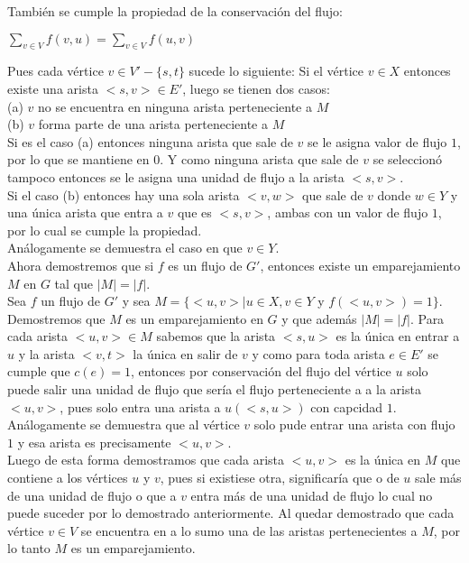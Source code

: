 \documentclass[12pt,a4paper]{report}
\begin{document}
Tambi\'en se cumple la propiedad de la conservaci\'on del flujo:
\begin{center}
$\sum_{v \in V}f(v,u) = \sum_{v \in V}f(u,v)$
\end{center}
Pues cada v\'ertice $v \in V'-\{s,t\}$ sucede lo siguiente: Si el v\'ertice $v \in X$ entonces existe una arista $<s,v> \in E'$, luego se tienen dos casos:\\
\newline
(a) $v$ no se encuentra en ninguna arista perteneciente a $M$\\
(b) $v$ forma parte de una arista perteneciente a $M$\\\newline
Si es el caso (a) entonces ninguna arista que sale de $v$ se le asigna valor de flujo $1$, por lo que se mantiene en $0$. Y como ninguna arista que sale de $v$ se seleccion\'o tampoco entonces se le asigna una unidad de flujo a la arista $<s,v>$.\\
Si el caso (b) entonces hay una sola arista $<v,w>$ que sale de $v$ donde $w \in Y$ y una \'unica arista que entra a $v$ que es $<s,v>$, ambas con un valor de flujo $1$, por lo cual se cumple la propiedad.
\\\newline
An\'alogamente se demuestra el caso en que $v \in Y$.
\\\newline
Ahora demostremos que si $f$ es un flujo de $G'$, entonces existe un emparejamiento $M$ en $G$ tal que $|M|=|f|$.
\\\newline
Sea $f$ un flujo de $G'$ y sea $M=\{<u,v>|u \in X,v \in Y$ y $f(<u,v>)=1\}$. Demostremos que $M$ es un emparejamiento en $G$ y que adem\'as $|M|=|f|$. Para cada arista $<u,v> \in M$ sabemos que la arista $<s,u>$ es la \'unica en entrar a $u$ y la arista $<v,t>$ la \'unica en salir de $v$ y como para toda arista $e \in E'$ se cumple que $c(e)=1$, entonces por conservaci\'on del flujo del v\'ertice $u$ solo puede salir una unidad de flujo que ser\'ia el flujo perteneciente a a la arista $<u,v>$, pues solo entra una arista a $u (<s,u>)$ con capcidad $1$.\\
\newline
An\'alogamente se demuestra que al v\'ertice $v$ solo pude entrar una arista con flujo $1$ y esa arista es precisamente $<u,v>$.\\\newline
Luego de esta forma demostramos que cada arista $<u,v>$ es la \'unica en $M$ que contiene a los v\'ertices $u$ y $v$, pues si existiese otra, significar\'ia que o de $u$ sale m\'as de una unidad de flujo o que a $v$ entra m\'as de una unidad de flujo lo cual no puede suceder por lo demostrado anteriormente. Al quedar demostrado que cada v\'ertice $v \in V$ se encuentra en a lo sumo una de las aristas pertenecientes a $M$, por lo tanto $M$ es un emparejamiento.\\\newline
\end{document}
